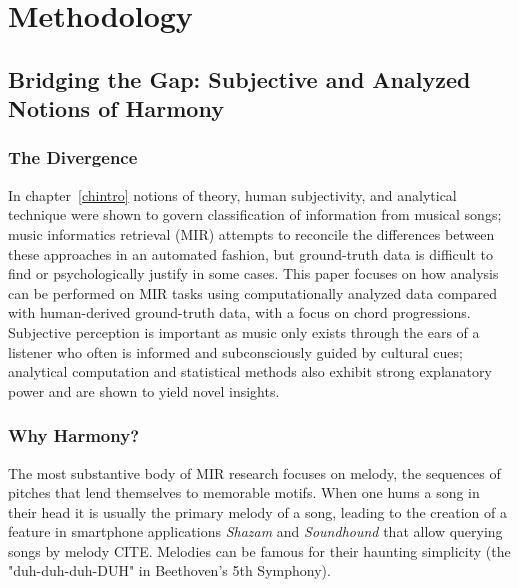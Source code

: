 \chapter{Methodology} \label{computationchordextract}

\section{Bridging the Gap: Subjective and Analyzed Notions of Harmony}

\subsection{The Divergence}

In chapter~\ref{chintro} notions of theory, human subjectivity, and analytical technique were shown to govern classification of information from musical songs; music informatics retrieval (MIR) attempts to reconcile the differences between these approaches in an automated fashion, but ground-truth data is difficult to find or psychologically justify in some cases. This paper focuses on how analysis can be performed on MIR tasks using computationally analyzed data compared with human-derived ground-truth data, with a focus on chord progressions. Subjective perception is important as music only exists through the ears of a listener who often is informed and subconsciously guided by cultural cues; analytical computation and statistical methods also exhibit strong explanatory power and are shown to yield novel insights. 


\subsection{Why Harmony?}

The most substantive body of MIR research focuses on melody, the sequences of pitches that lend themselves to memorable motifs. When one hums a song in their head it is usually the primary melody of a song, leading to the creation of a feature in smartphone applications \textit{Shazam} and \textit{Soundhound} that allow querying songs by melody CITE. Melodies can be famous for their haunting simplicity (the "duh-duh-duh-DUH" in Beethoven's 5th Symphony).

